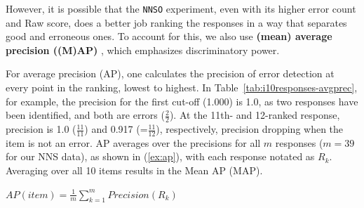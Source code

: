 \documentclass[11pt,letterpaper]{article}
\newcommand{\param}[1]{\texttt{#1}}
\begin{document}
However, it is possible that the \param{NNSO} experiment, even with
its higher error count and Raw score, does a better job ranking the
responses in a way that separates good and erroneous ones. To account
for this, we also use \textbf{(mean) average precision ((M)AP)}
\citep[][ch. 8]{manning-et-al:08}, which emphasizes discriminatory
power.

For average precision (AP), one calculates the precision of error
detection at every point in the ranking, lowest to highest.  In
Table~\ref{tab:i10responses-avgprec}, for example, the precision for
the first cut-off (1.000) is 1.0, as two responses have been
identified, and both are errors ($\frac{2}{2}$). At the 11th- and
12-ranked response, precision is 1.0 ($\frac{11}{11}$) and 0.917
(=$\frac{11}{12}$), respectively, precision dropping when the item is
not an error.
AP averages over the precisions for all $m$ responses ($m=39$ for our
NNS data), as shown in (\ref{ex:ap}), with each response notated as
$R_k$.  Averaging over all 10 items results in the Mean AP (MAP).

\begin{exe}
  \ex\label{ex:ap} $AP(item) = \frac{1}{m} \sum\limits_{k=1}^m
  Precision(R_k)$
\end{exe}


\end{document}
